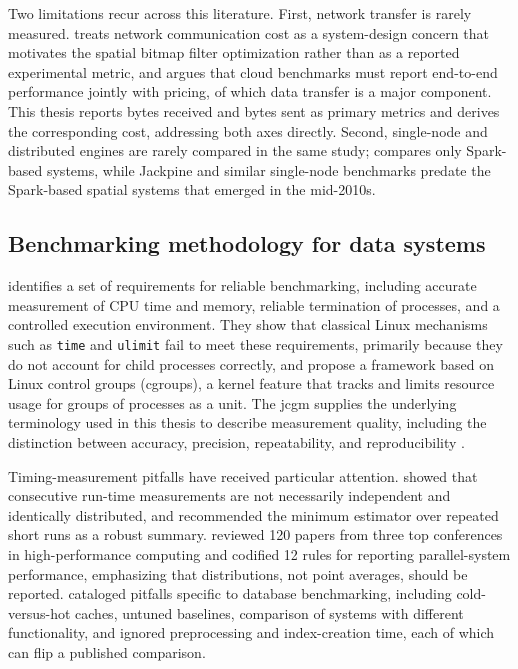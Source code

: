 Two limitations recur across this literature. First, network transfer is rarely measured. \textcite{tang2020_locationspark_distributed_spatial_query} treats network communication cost as a system-design concern that motivates the spatial bitmap filter optimization rather than as a reported experimental metric, and \textcite{folkerts2012_benchmarking_in_the_cloud} argues that cloud benchmarks must report end-to-end performance jointly with pricing, of which data transfer is a major component. This thesis reports bytes received and bytes sent as primary metrics and derives the corresponding cost, addressing both axes directly. Second, single-node and distributed engines are rarely compared in the same study; \textcite{pandey2018_how_good_modern_spatial_analytics} compares only Spark-based systems, while Jackpine and similar single-node benchmarks predate the Spark-based spatial systems that emerged in the mid-2010s.

\subsection{Benchmarking methodology for data systems}

\textcite{beyer_2015_benchmarking_and_resource_measurement} identifies a set of requirements for reliable benchmarking, including accurate measurement of CPU time and memory, reliable termination of processes, and a controlled execution environment. They show that classical Linux mechanisms such as \texttt{time} and \texttt{ulimit} fail to meet these requirements, primarily because they do not account for child processes correctly, and propose a framework based on Linux control groups (cgroups), a kernel feature that tracks and limits resource usage for groups of processes as a unit. The \acrfull{jcgm} supplies the underlying terminology used in this thesis to describe measurement quality, including the distinction between accuracy, precision, repeatability, and reproducibility \parencite{jcgm2012_international_vocabulary_of_metrology}.

Timing-measurement pitfalls have received particular attention. \textcite{chen2016_robust_benchmarking_noisy_environments} showed that consecutive run-time measurements are not necessarily independent and identically distributed, and recommended the minimum estimator over repeated short runs as a robust summary. \textcite{hoefler2015_scientific_benchmarking_parallel} reviewed \num{120} papers from three top conferences in high-performance computing and codified \num{12} rules for reporting parallel-system performance, emphasizing that distributions, not point averages, should be reported. \textcite{raasveldt2018_fair_benchmarking_database_systems} cataloged pitfalls specific to database benchmarking, including cold-versus-hot caches, untuned baselines, comparison of systems with different functionality, and ignored preprocessing and index-creation time, each of which can flip a published comparison.

